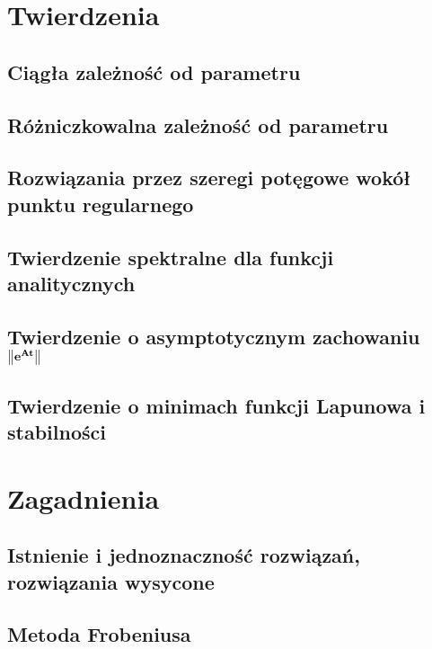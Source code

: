 



  \maketitle
  
  \tableofcontents
  
  \chapter{Twierdzenia}
    \section{Ciągła zależność od parametru}
      
    \section{Różniczkowalna zależność od parametru}
      
    \section{Rozwiązania przez szeregi potęgowe wokół punktu regularnego}
      
    \section{Twierdzenie spektralne dla funkcji analitycznych}
      
    \section{Twierdzenie o asymptotycznym zachowaniu $\mathbf{ \norm*{ e^{At} } } $}
      
    \section{Twierdzenie o minimach funkcji Lapunowa i stabilności}
    
  \chapter{Zagadnienia}
    \section{Istnienie i jednoznaczność rozwiązań, rozwiązania wysycone}
      
    \section{Metoda Frobeniusa}
      
